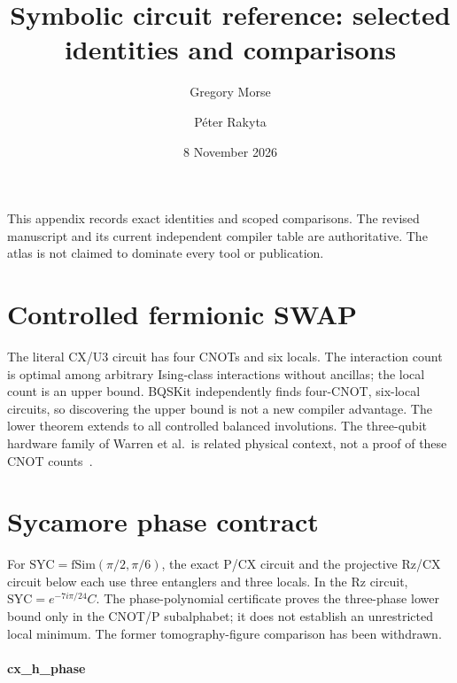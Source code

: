 \documentclass[11pt]{article}
\title{Symbolic circuit reference: selected identities and comparisons}
\author{Gregory Morse \and P\'eter Rakyta}\date{8 November 2026}
\begin{document}
\maketitle
This appendix records exact identities and scoped comparisons. The revised
manuscript and its current independent compiler table are authoritative.
The atlas is not claimed to dominate every tool or publication.
\section{Controlled fermionic SWAP}
The literal CX/U3 circuit has four CNOTs and six locals. The interaction
count is optimal among arbitrary Ising-class interactions without ancillas;
the local count is an upper bound. BQSKit independently finds four-CNOT,
six-local circuits, so discovering the upper bound is not a new compiler
advantage. The lower theorem extends to all controlled balanced involutions.
The three-qubit hardware family of Warren et al.\ is related physical
context, not a proof of these CNOT counts~\cite{fermionic}.
\section{Sycamore phase contract}
For $\mathrm{SYC}=\mathrm{fSim}(\pi/2,\pi/6)$, the exact P/CX circuit and
the projective Rz/CX circuit below each use three entanglers and three
locals. In the Rz circuit, $\mathrm{SYC}=e^{-7i\pi/24}C$.
The phase-polynomial certificate proves the three-phase lower bound only
in the CNOT/P subalphabet; it does not establish an unrestricted local
minimum. The former tomography-figure comparison has been withdrawn.
\paragraph{cx\_h\_phase}\begin{center}\end{center}
\end{document}
